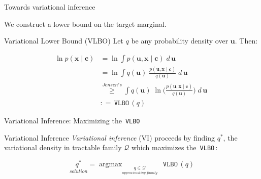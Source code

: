 \documentclass[10pt]{beamer}
\newcommand{\ds}{\displaystyle}
\newcommand{\df}{\displaystyle\frac}
\newcommand{\+}[1]{\ensuremath{{\boldsymbol #1}}} %
\newcommand{\cond}{\; | \;}
\DeclareMathOperator*{\argmax}{argmax} %
\newcommand{\Q}{\mathcal{Q}}
\newcommand{\wrt}[1]{\; d \,{#1} \;}
\newcommand{\VLBO}{\,\texttt{VLBO}\,}
\begin{document}
%


\begin{frame}{Towards variational inference}
 

We construct a lower bound on the target marginal. 



\begin{block}{Variational Lower Bound (VLBO)}
Let $q$ be any probability density over $\+u$. Then:

\begin{align*}
\ln p(\+x \cond \+c) & = \ln \ds\int  p(\+u, \+x  \cond \+c) \wrt{\+u}  \\ 
& = \ln \ds\int  q(\+u) \; \df{p(\+u, \+x  \cond \+c )}{q(\+u)} \wrt{\+u}  \\ 
& \stackrel{Jensen's}{\geq} \ds\int  q(\+u) \; \ln \bigg( \df{p(\+u, \+x  \cond \+c)}{q(\+u)} \bigg) \wrt{\+u} \\
& : = \VLBO(q) 
\end{align*}
\end{block} 

 


\end{frame} 
%
%
\begin{frame}{Variational Inference: Maximizing the 
\VLBO}


\begin{block}{Variational Inference}
\textit{Variational inference} (VI) proceeds by finding $q^*$, the variational density in tractable family $\Q$ which maximizes the \VLBO :

\[ \underset{solution}{q^*} = \argmax_{\underset{approximating \; family}{q \in \mathcal{Q}}} \; \VLBO ( q) \]
\end{block} 


\vfill \vfill

\small
\end{frame} 
\end{document}
